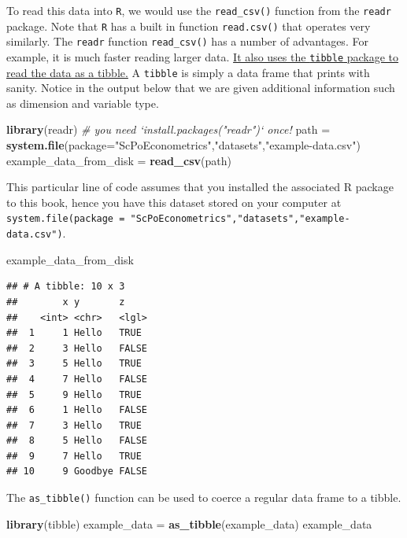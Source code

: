 \documentclass[]{book}
\newenvironment{Shaded}{\begin{snugshade}}{\end{snugshade}}
\newcommand{\KeywordTok}[1]{\textcolor[rgb]{0.13,0.29,0.53}{\textbf{#1}}}
\newcommand{\DataTypeTok}[1]{\textcolor[rgb]{0.13,0.29,0.53}{#1}}
\newcommand{\StringTok}[1]{\textcolor[rgb]{0.31,0.60,0.02}{#1}}
\newcommand{\CommentTok}[1]{\textcolor[rgb]{0.56,0.35,0.01}{\textit{#1}}}
\newcommand{\NormalTok}[1]{#1}
\theoremstyle{definition}
\theoremstyle{definition}
\theoremstyle{definition}
\theoremstyle{remark}
\begin{document}
To read this data into \texttt{R}, we would use the \texttt{read\_csv()}
function from the \texttt{readr} package. Note that \texttt{R} has a
built in function \texttt{read.csv()} that operates very similarly. The
\texttt{readr} function \texttt{read\_csv()} has a number of advantages.
For example, it is much faster reading larger data.
\href{https://cran.r-project.org/web/packages/tibble/vignettes/tibble.html}{It
also uses the \texttt{tibble} package to read the data as a tibble.} A
\texttt{tibble} is simply a data frame that prints with sanity. Notice
in the output below that we are given additional information such as
dimension and variable type.

\begin{Shaded}
\begin{Highlighting}[]
\KeywordTok{library}\NormalTok{(readr)  }\CommentTok{# you need `install.packages("readr")` once!}
\NormalTok{path =}\StringTok{ }\KeywordTok{system.file}\NormalTok{(}\DataTypeTok{package=}\StringTok{"ScPoEconometrics"}\NormalTok{,}\StringTok{"datasets"}\NormalTok{,}\StringTok{"example-data.csv"}\NormalTok{)}
\NormalTok{example_data_from_disk =}\StringTok{ }\KeywordTok{read_csv}\NormalTok{(path)}
\end{Highlighting}
\end{Shaded}

This particular line of code assumes that you installed the associated R
package to this book, hence you have this dataset stored on your
computer at
\texttt{system.file(package\ =\ "ScPoEconometrics","datasets","example-data.csv")}.

\begin{Shaded}
\begin{Highlighting}[]
\NormalTok{example_data_from_disk}
\end{Highlighting}
\end{Shaded}

\begin{verbatim}
## # A tibble: 10 x 3
##        x y       z    
##    <int> <chr>   <lgl>
##  1     1 Hello   TRUE 
##  2     3 Hello   FALSE
##  3     5 Hello   TRUE 
##  4     7 Hello   FALSE
##  5     9 Hello   TRUE 
##  6     1 Hello   FALSE
##  7     3 Hello   TRUE 
##  8     5 Hello   FALSE
##  9     7 Hello   TRUE 
## 10     9 Goodbye FALSE
\end{verbatim}

The \texttt{as\_tibble()} function can be used to coerce a regular data
frame to a tibble.

\begin{Shaded}
\begin{Highlighting}[]
\KeywordTok{library}\NormalTok{(tibble)}
\NormalTok{example_data =}\StringTok{ }\KeywordTok{as_tibble}\NormalTok{(example_data)}
\NormalTok{example_data}
\end{Highlighting}
\end{Shaded}
\end{document}
